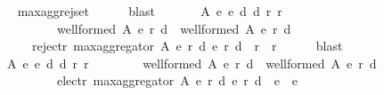 \begin{isabellebody}
\ \ \ \ \isamarkupfalse%
\ max{\isacharunderscore}{\kern0pt}agg{\isacharunderscore}{\kern0pt}rej{\isacharunderscore}{\kern0pt}set\isanewline
\ \ \ \ \isamarkupfalse%
\ blast\isanewline
\ \ \isamarkupfalse%
\isanewline
\ \ \ \ {\isachardoublequoteopen}{\isasymforall}A\ e{}\ e{}\ d{}\ d{}\ r{}\ r{}{\isachardot}{\kern0pt}\isanewline
\ \ \ \ \ \ \ \ \ \ \ \ {\isacharparenleft}{\kern0pt}well{\isacharunderscore}{\kern0pt}formed\ A\ {\isacharparenleft}{\kern0pt}e{}{\isacharcomma}{\kern0pt}\ r{}{\isacharcomma}{\kern0pt}\ d{}{\isacharparenright}{\kern0pt}\ {\isasymand}\ well{\isacharunderscore}{\kern0pt}formed\ A\ {\isacharparenleft}{\kern0pt}e{}{\isacharcomma}{\kern0pt}\ r{}{\isacharcomma}{\kern0pt}\ d{}{\isacharparenright}{\kern0pt}{\isacharparenright}{\kern0pt}\ {\isasymlongrightarrow}\isanewline
\ \ \ \ \ \ \ \ reject{\isacharunderscore}{\kern0pt}r\ {\isacharparenleft}{\kern0pt}max{\isacharunderscore}{\kern0pt}aggregator\ A\ {\isacharparenleft}{\kern0pt}e{}{\isacharcomma}{\kern0pt}\ r{}{\isacharcomma}{\kern0pt}\ d{}{\isacharparenright}{\kern0pt}\ {\isacharparenleft}{\kern0pt}e{}{\isacharcomma}{\kern0pt}\ r{}{\isacharcomma}{\kern0pt}\ d{}{\isacharparenright}{\kern0pt}{\isacharparenright}{\kern0pt}\ {\isasymsubseteq}\ r{}\ {\isasyminter}\ r{}{\isachardoublequoteclose}\isanewline
\ \ \ \ \isamarkupfalse%
\ blast\isanewline
\ \ \isamarkupfalse%
\ \isamarkupfalse%
\isanewline
\ \ \ \ {\isachardoublequoteopen}{\isasymforall}A\ e{}\ e{}\ d{}\ d{}\ r{}\ r{}{\isachardot}{\kern0pt}\isanewline
\ \ \ \ \ \ \ \ {\isacharparenleft}{\kern0pt}well{\isacharunderscore}{\kern0pt}formed\ A\ {\isacharparenleft}{\kern0pt}e{}{\isacharcomma}{\kern0pt}\ r{}{\isacharcomma}{\kern0pt}\ d{}{\isacharparenright}{\kern0pt}\ {\isasymand}\ well{\isacharunderscore}{\kern0pt}formed\ A\ {\isacharparenleft}{\kern0pt}e{}{\isacharcomma}{\kern0pt}\ r{}{\isacharcomma}{\kern0pt}\ d{}{\isacharparenright}{\kern0pt}{\isacharparenright}{\kern0pt}\ {\isasymlongrightarrow}\isanewline
\ \ \ \ \ \ \ \ \ \ \ \ elect{\isacharunderscore}{\kern0pt}r\ {\isacharparenleft}{\kern0pt}max{\isacharunderscore}{\kern0pt}aggregator\ A\ {\isacharparenleft}{\kern0pt}e{}{\isacharcomma}{\kern0pt}\ r{}{\isacharcomma}{\kern0pt}\ d{}{\isacharparenright}{\kern0pt}\ {\isacharparenleft}{\kern0pt}e{}{\isacharcomma}{\kern0pt}\ r{}{\isacharcomma}{\kern0pt}\ d{}{\isacharparenright}{\kern0pt}{\isacharparenright}{\kern0pt}\ {\isasymsubseteq}\ {\isacharparenleft}{\kern0pt}e{}\ {\isasymunion}\ e{}{\isacharparenright}{\kern0pt}{\isachardoublequoteclose}\isanewline

\end{isabellebody}
